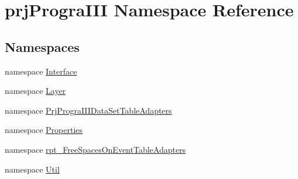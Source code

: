 \hypertarget{namespaceprj_progra_i_i_i}{}\section{prj\+Progra\+I\+II Namespace Reference}
\label{namespaceprj_progra_i_i_i}
\subsection*{Namespaces}
\begin{DoxyCompactItemize}
\item 
namespace \hyperlink{namespaceprj_progra_i_i_i_1_1_interface}{Interface}
\item 
namespace \hyperlink{namespaceprj_progra_i_i_i_1_1_layer}{Layer}
\item 
namespace \hyperlink{namespaceprj_progra_i_i_i_1_1_prj_progra_i_i_i_data_set_table_adapters}{Prj\+Progra\+I\+I\+I\+Data\+Set\+Table\+Adapters}
\item 
namespace \hyperlink{namespaceprj_progra_i_i_i_1_1_properties}{Properties}
\item 
namespace \hyperlink{namespaceprj_progra_i_i_i_1_1rpt___free_spaces_on_event_table_adapters}{rpt\+\_\+\+Free\+Spaces\+On\+Event\+Table\+Adapters}
\item 
namespace \hyperlink{namespaceprj_progra_i_i_i_1_1_util}{Util}
\end{DoxyCompactItemize}

